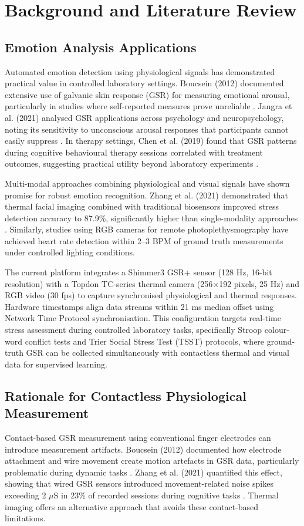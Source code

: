 \chapter{Background and Literature Review}


\section{Emotion Analysis Applications}
Automated emotion detection using physiological signals has demonstrated practical value in controlled laboratory settings. Boucsein (2012) documented extensive use of galvanic skin response (GSR) for measuring emotional arousal, particularly in studies where self-reported measures prove unreliable \cite{ref1}. Jangra et al. (2021) analysed GSR applications across psychology and neuropsychology, noting its sensitivity to unconscious arousal responses that participants cannot easily suppress \cite{ref3}. In therapy settings, Chen et al. (2019) found that GSR patterns during cognitive behavioural therapy sessions correlated with treatment outcomes, suggesting practical utility beyond laboratory experiments \cite{ref4}.

Multi-modal approaches combining physiological and visual signals have shown promise for robust emotion recognition. Zhang et al. (2021) demonstrated that thermal facial imaging combined with traditional biosensors improved stress detection accuracy to 87.9\%, significantly higher than single-modality approaches \cite{ref5}. Similarly, studies using RGB cameras for remote photoplethysmography have achieved heart rate detection within 2--3 BPM of ground truth measurements under controlled lighting conditions.

The current platform integrates a Shimmer3 GSR+ sensor (128 Hz, 16-bit resolution) with a Topdon TC-series thermal camera (256$\times$192 pixels, 25 Hz) and RGB video (30 fps) to capture synchronised physiological and thermal responses. Hardware timestamps align data streams within 21 ms median offset using Network Time Protocol synchronisation. This configuration targets real-time stress assessment during controlled laboratory tasks, specifically Stroop colour-word conflict tests and Trier Social Stress Test (TSST) protocols, where ground-truth GSR can be collected simultaneously with contactless thermal and visual data for supervised learning.


\section{Rationale for Contactless Physiological Measurement}
Contact-based GSR measurement using conventional finger electrodes can introduce measurement artifacts. Boucsein (2012) documented how electrode attachment and wire movement create motion artefacts in GSR data, particularly problematic during dynamic tasks \cite{ref1}. Zhang et al. (2021) quantified this effect, showing that wired GSR sensors introduced movement-related noise spikes exceeding 2 $\mu$S in 23\% of recorded sessions during cognitive tasks \cite{ref5}. Thermal imaging offers an alternative approach that avoids these contact-based limitations.

